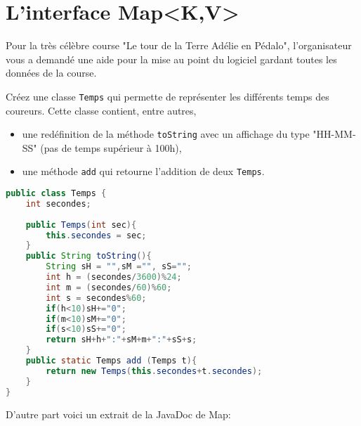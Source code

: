 \documentclass[iutinfo,a4paper,nocorrections,10pt]{ustl-tdtp}
\begin{document}
\section{L'interface Map<K,V>}


Pour la très célèbre course "Le tour de la Terre Adélie en Pédalo",
l'organisateur vous a demandé une aide pour la mise au point du
logiciel gardant toutes les données de la course. 

\question Créez une classe \texttt{Temps} qui permette
de représenter les différents temps des coureurs. Cette classe
contient, entre autres, 
\begin{itemize}
\item une redéfinition de la méthode \texttt{toString} avec un affichage du type "HH-MM-SS" (pas de temps supérieur à 100h),
\item une méthode \texttt{add} qui retourne l'addition de deux \texttt{Temps}.
\end{itemize}
\begin{correction}
{\color{red}
\begin{lstlisting}[language=Java]
public class Temps {
	int secondes;
	
	public Temps(int sec){
		this.secondes = sec;
	}
	public String toString(){
		String sH = "",sM ="", sS="";
		int h = (secondes/3600)%24;
		int m = (secondes/60)%60;
		int s = secondes%60;
		if(h<10)sH+="0";
		if(m<10)sM+="0";
		if(s<10)sS+="0";
		return sH+h+":"+sM+m+":"+sS+s;
	}
	public static Temps add (Temps t){
		return new Temps(this.secondes+t.secondes);
	}
}
\end{lstlisting}
}
\end{correction}

D'autre part voici un extrait de la JavaDoc de Map:
\end{document}
